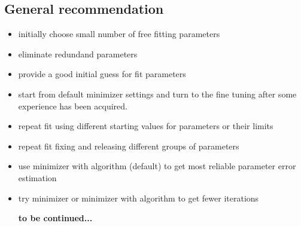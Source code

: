 \subsection*{General recommendation}
\begin{itemize}
\item initially choose small number of free fitting parameters
\item eliminate redundand parameters
\item provide a good initial guess for fit parameters
\item start from default minimizer settings and turn to the fine tuning after some experience has been acquired.
\item repeat fit using different starting values for parameters or their limits
\item repeat fit fixing and releasing different groups  of parameters
\item use  minimizer with  algorithm (default) to get most reliable parameter error estimation
\item try  minimizer or  minimizer with  algorithm to get fewer iterations




{\bf to be continued... }


\end{itemize}
